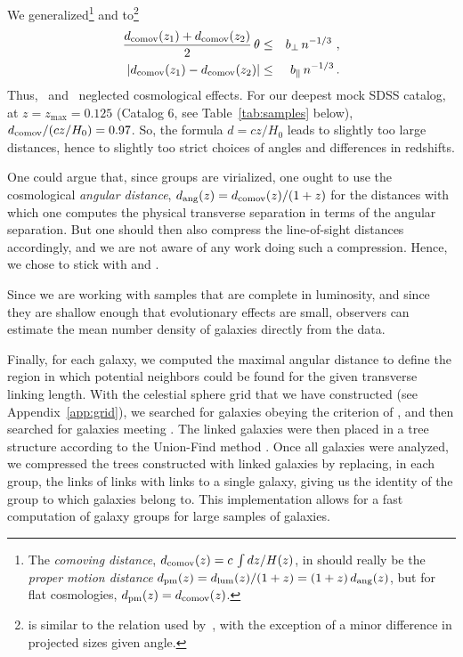 We generalized\footnote{The \emph{comoving distance}, $d_{\rm comov}(z) =
    c\,\int dz/H(z)$, in  should really be the
    \emph{proper motion distance} $d_{\rm pm} (z) = d_{\rm lum}(z)/(1+z) =
    (1+z) \,d_{\rm ang}(z)$, but for flat cosmologies, $d_{\rm pm}(z) = d_{\rm
comov}(z)$.}  and 
to\footnote{ is similar to the relation used
    by~\cite{Zandivarez+14}, with the exception of a minor difference in
projected sizes given angle.}
%
\begin{eqnarray}
    {d_{\rm comov}(z_1) + d_{\rm comov}(z_2)\over 2}\,\theta
    &\leq&  b_\perp\,  n^{-1/3} \ ,
    \label{eq:thetamax}
\\
|d_{\rm comov}(z_1)-d_{\rm comov}(z_2)| &\leq&
b_\parallel\, n^{-1/3} \,.
\label{eq:deltadmax}
\end{eqnarray}
%
Thus,~\cite{HG82} and~\cite{Berlind+06} neglected cosmological effects. For our
deepest mock SDSS catalog, at $z = z_{ \max } = 0.125$ (Catalog 6, see
Table~\ref{tab:samples} below), $d_{\rm comov}/(cz/H_0) = 0.97$. So, the
formula $d=c z/H_0$ leads to slightly too large distances, hence to slightly
too strict choices of angles and differences in redshifts.

One could argue that, since groups are virialized, one ought to use the
cosmological \emph{angular distance}, $d_{\rm ang}(z) = d_{\rm comov}(z)/(1+z)$
for the distances with which one computes the physical transverse separation in
terms of the angular separation. But one should then also compress the
line-of-sight distances accordingly, and we are not aware of any work doing
such a compression. Hence, we chose to stick with 
and .

Since we are working with samples that are complete in luminosity, and since
they are shallow enough that evolutionary effects are small, observers can
estimate the mean number density of galaxies directly from the data.

Finally, for each galaxy, we computed the maximal angular distance to define
the region in which potential neighbors could be found for the given transverse
linking length. With the  celestial sphere grid that we have constructed (see
Appendix~\ref{app:grid}), we searched for galaxies obeying the criterion of
, and then searched for galaxies meeting
. The linked galaxies were then placed in a tree
structure according to the Union-Find method \citep{Tarjan84}. Once all
galaxies were analyzed, we compressed the trees constructed with linked
galaxies by replacing, in each group, the links of links with links to a single
galaxy, giving us the identity of the group to which galaxies belong to. This
implementation allows for a fast computation of galaxy groups for large samples
of galaxies.

